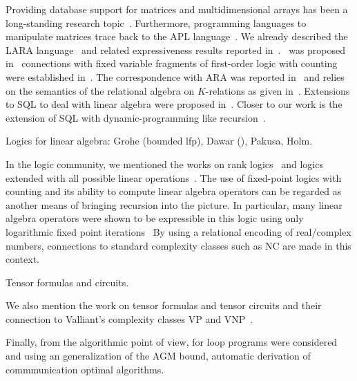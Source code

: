 Providing database support for matrices and multidimensional arrays has been 
a long-standing research topic~\cite{SurveyArrays}. Furthermore, programming
languages to manipulate matrices trace back to the \textsf{APL} language~\cite{APL}.
We already described the \textsf{LARA} language~\cite{} and related expressiveness
results reported in~\cite{}. \lang\ was proposed in~\cite{} connections with
fixed variable fragments of first-order logic with counting were established in~\cite{}.
The correspondence with \textsf{ARA} was reported in~\cite{} and relies on the semantics
of the relational algebra on $K$-relations as given in~\cite{}. 
Extensions to \textsf{SQL}
to deal with linear algebra were proposed in~\cite{}. Closer to our work is the extension
of \textsf{SQL} with dynamic-programming like recursion~\cite{}.


Logics for linear algebra: Grohe (bounded lfp), Dawar (), Pakusa, Holm.

In the logic community, we mentioned the works on rank logics~\cite{} and logics extended
with all possible linear operations~\cite{}. The use of fixed-point logics
with counting and its ability to compute linear algebra operators can be regarded as another
means of bringing recursion into the picture. In particular, many linear algebra operators
were shown to be expressible in this logic using only logarithmic fixed point iterations~\cite{}
By using a relational encoding of real/complex numbers, connections to standard complexity classes
such as NC are made in this context.

Tensor formulas and circuits.

We also mention the work on tensor formulas and tensor circuits and their connection
to Valliant's complexity classes VP and VNP~\cite{}. 

Finally, from the algorithmic point of view, for loop programs were considered and using
an generalization of the AGM bound, automatic derivation of commmunication optimal algorithms.




